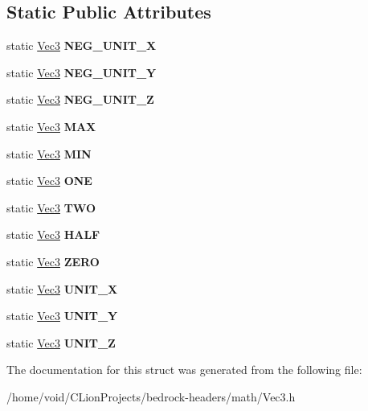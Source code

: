 \subsection*{Static Public Attributes}
\begin{DoxyCompactItemize}
\item 
\mbox{\label{struct_vec3_afe8d34365428e4e4ddb25043f021a2aa}} 
static \mbox{\hyperlink{struct_vec3}{Vec3}} {\bfseries N\+E\+G\+\_\+\+U\+N\+I\+T\+\_\+X}
\item 
\mbox{\label{struct_vec3_a7dc89a508bb9e8de2a4c9c4e5c88c6c2}} 
static \mbox{\hyperlink{struct_vec3}{Vec3}} {\bfseries N\+E\+G\+\_\+\+U\+N\+I\+T\+\_\+Y}
\item 
\mbox{\label{struct_vec3_a181d65e515e327962611b092abe6905c}} 
static \mbox{\hyperlink{struct_vec3}{Vec3}} {\bfseries N\+E\+G\+\_\+\+U\+N\+I\+T\+\_\+Z}
\item 
\mbox{\label{struct_vec3_a00fd3a91eeeeae2adc0b86cfc8c13b93}} 
static \mbox{\hyperlink{struct_vec3}{Vec3}} {\bfseries M\+AX}
\item 
\mbox{\label{struct_vec3_a5d00603a35fba0a77ccb16d7492b52c5}} 
static \mbox{\hyperlink{struct_vec3}{Vec3}} {\bfseries M\+IN}
\item 
\mbox{\label{struct_vec3_aaf6ec712c4ccdd58f90d8b6049bc5c6c}} 
static \mbox{\hyperlink{struct_vec3}{Vec3}} {\bfseries O\+NE}
\item 
\mbox{\label{struct_vec3_a19921a469a03a0785acdf2b740babe41}} 
static \mbox{\hyperlink{struct_vec3}{Vec3}} {\bfseries T\+WO}
\item 
\mbox{\label{struct_vec3_adaebd9e1e2dded568fbf0c82f27ab422}} 
static \mbox{\hyperlink{struct_vec3}{Vec3}} {\bfseries H\+A\+LF}
\item 
\mbox{\label{struct_vec3_ac4406d444c4c9b384f97c33b173ef49c}} 
static \mbox{\hyperlink{struct_vec3}{Vec3}} {\bfseries Z\+E\+RO}
\item 
\mbox{\label{struct_vec3_ad487f2983a52cb114d96449f895a1305}} 
static \mbox{\hyperlink{struct_vec3}{Vec3}} {\bfseries U\+N\+I\+T\+\_\+X}
\item 
\mbox{\label{struct_vec3_a3f6f476f6286550c1f564678fc9a2efa}} 
static \mbox{\hyperlink{struct_vec3}{Vec3}} {\bfseries U\+N\+I\+T\+\_\+Y}
\item 
\mbox{\label{struct_vec3_a48ec8b52e6eb0aa404eb3f37d7d960b7}} 
static \mbox{\hyperlink{struct_vec3}{Vec3}} {\bfseries U\+N\+I\+T\+\_\+Z}
\end{DoxyCompactItemize}


The documentation for this struct was generated from the following file\+:\begin{DoxyCompactItemize}
\item 
/home/void/\+C\+Lion\+Projects/bedrock-\/headers/math/Vec3.\+h\end{DoxyCompactItemize}
